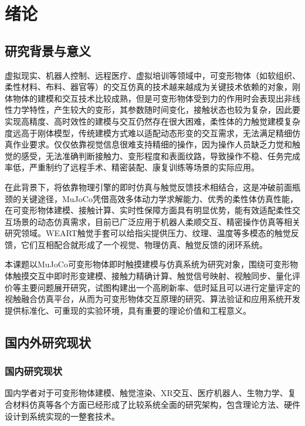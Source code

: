 \section{绪论}

\subsection{研究背景与意义}
虚拟现实、机器人控制、远程医疗、虚拟培训等领域中，可变形物体（如软组织、柔性材料、布料、器官等）的交互仿真的技术越来越成为关键技术依赖的对象，刚体物体的建模和交互技术比较成熟，但是可变形物体受到力的作用时会表现出非线性力学特性，产生较大的变形，其参数随时间变化，接触状态也较为复杂，因此要实现高精度、高时效性的建模与交互仍然存在很大困难，柔性体的力触觉建模复杂度远高于刚体模型，传统建模方式难以适配动态形变的交互需求，无法满足精细仿真作业要求\cite{yang2023}。仅仅依靠视觉信息很难支持精细的操作，因为操作人员缺乏力觉和触觉的感受，无法准确判断接触力、变形程度和表面纹路，导致操作不稳、任务完成率低，严重制约了远程手术、精密装配、康复训练等场景的实际应用\cite{fang2011}。

在此背景下，将依靠物理引擎的即时仿真与触觉反馈技术相结合，这是冲破前面瓶颈的关键途径，MuJoCo凭借高效多体动力学求解能力、优秀的柔性体仿真性能，在可变形物体建模、接触计算、实时性保障方面具有明显优势，能有效适配柔性交互场景的动态仿真需求，目前已广泛应用于机器人柔顺交互、精密操作仿真等相关研究领域\cite{zhang2024}。WEART触觉手套可以给指尖提供压力、纹理、温度等多模态的触觉反馈，它们互相配合就形成了一个视觉、物理仿真、触觉反馈的闭环系统。

本课题以MuJoCo可变形物体即时触摸建模与仿真系统为研究对象，围绕可变形物体触摸交互中即时形变建模、接触力精确计算、触觉信号映射、视触同步、量化评价等主要问题展开研究，试图构建出一个高刷新率、低时延且可以进行定量评定的视触融合仿真平台，从而为可变形物体交互原理的研究、算法验证和应用系统开发提供标准化、可重现的实验环境，具有重要的理论价值和工程意义。

\subsection{国内外研究现状}

\subsubsection{国内研究现状}
国内学者对于可变形物体建模、触觉渲染、XR交互、医疗机器人、生物力学、复合材料仿真等各个方面已经形成了比较系统全面的研究架构，包含理论方法、硬件设计到系统实现的一整套技术。

